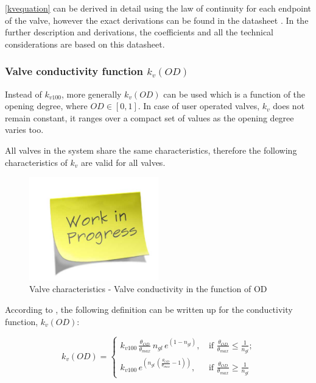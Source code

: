 \eqref{kvequation} can be derived in detail using the law of continuity for each endpoint of the valve, however the exact derivations can be found in the datasheet \cite{kvvalve}. In the further description and derivations, the coefficients and all the technical considerations are based on this datasheet.  

\subsubsection{Valve conductivity function $k_v(OD)$}
\label{OD}

Instead of $k_{v100}$, more generally $k_v(OD)$ can be used which is a function of the opening degree, where $OD \in  [0,1]$. In case of user operated valves, $k_{v}$ does not remain constant, it ranges over a compact set of values as the opening degree varies too. \cite{Kallesoe2009}

All valves in the system share the same characteristics, therefore the following characteristics of $k_{v}$ are valid for all valves. 

\begin{figure}[H]
\label{valve_conductivity}
\centering
\includegraphics[width=0.5\textwidth]{report/pictures/missingfigure}
\caption{Valve characteristics - Valve conductivity in the function of OD}
\end{figure}

According to \cite{keller}, the following definition can be written up for the conductivity function, $k_v(OD)$:


\begin{equation}
\label{kvFunction}
 k_v(OD) =
		\left\{
		\begin{array}{ll}
		
		k_{v100} \, \frac{\theta_{OD}}{\theta_{max}} \, n_{gl} \, e^{(1-n_{gl})} \text{,} & \mbox{ if } 								\frac{\theta_{OD}}{\theta_{max}} \leq \frac{1}					{n_{gl}} \text{;}
\\
		k_{v100} \, e^{(n_{gl} \,(\frac{\theta_{OD}}{\theta_{max}}-1))} \text{,} & \mbox{ if } \frac{\theta_{OD}}{\theta_{max}} \geq \frac{1}{n_{gl}}

		\end{array}
		\right.
\end{equation}	

